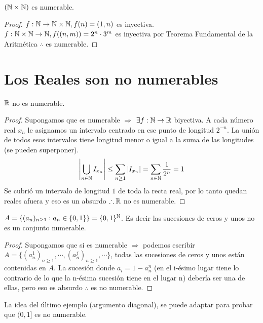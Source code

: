 \begin{eg}
    \((\mathbb{N} \times \mathbb{N})\) es numerable.
    \begin{proof}
        \(f: \mathbb{N} \to \mathbb{N}\times \mathbb{N}, f(n)=(1, n)\) es inyectiva.
        \(f: \mathbb{N}\times \mathbb{N} \to \mathbb{N} , f((n, m))= 2^n \cdot 3^m\) es inyectiva por Teorema Fundamental de la Aritmética \(\therefore\) es numerable.
    \end{proof}
\end{eg}

\section{Los Reales son no numerables}

\begin{theorem}
    \(\mathbb{R}\)  no es numerable.
    \begin{proof}
        Supongamos que es numerable \(\Rightarrow\)
        \(\exists f: \mathbb{N} \to \mathbb{R}\) biyectiva. A cada número real \(x_n\) le asignamos un intervalo centrado en ese punto de longitud \(2^{-n}\). La unión de todos esos intervalos tiene longitud menor o igual a la suma de las longitudes (se pueden superponer).
        \begin{align*}
            \left|\bigcup_{n \in \mathbb{N}} I_{x_n}\right| \leq \sum_{n \geq 1} |I_{x_n}| = \sum_{n \in \mathbb{N}}\dfrac{1}{2^n} = 1
        \end{align*}
        Se cubrió un intervalo de longitud \(1\) de toda la recta real, por lo tanto quedan reales afuera y eso es un absurdo \(\therefore \mathbb{R}\) no es numerable.
    \end{proof}
\end{theorem}

\begin{eg}
    \(A = \{ (a_n)_{n \geq 1} : a_n \in \{0, 1\}\} = \{0, 1\}^{\mathbb{N}}\). Es decir las sucesiones de ceros y unos no es un conjunto numerable.
    \begin{proof}
        Supongamos que si es numerable \(\Rightarrow\) podemos escribir \\ \(A = \{ (a_n^1)_{n\geq1}, \cdots, (a_n^j)_{n\geq1}, \cdots \}\), todas las sucesiones de ceros y unos están contenidas en \(A\). La sucesión donde \(a_i=1-a_n^n\) (en el i-ésimo lugar tiene lo contrario de lo que la n-ésima sucesión tiene en el lugar n) debería ser una de ellas, pero eso es absurdo \(\therefore\) es no numerable.
    \end{proof}
\end{eg}

La idea del último ejemplo (argumento diagonal), se puede adaptar para probar que \((0, 1]\) es no numerable.

